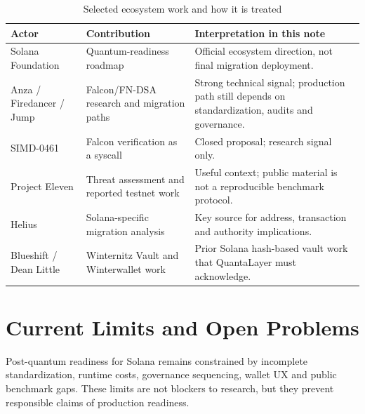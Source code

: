 \documentclass[11pt,a4paper,oneside,parskip=false]{scrartcl}
\begin{document}
\begin{table}[htbp]
\centering
\caption{Selected ecosystem work and how it is treated}
\label{tab:ecosystem-state}
\small
\begin{tabularx}{\textwidth}{L{0.23\textwidth}L{0.24\textwidth}Y}
\toprule
\textbf{Actor} & \textbf{Contribution} & \textbf{Interpretation in this note} \\
\midrule
Solana Foundation & Quantum-readiness roadmap & Official ecosystem direction, not final migration deployment. \\
Anza / Firedancer / Jump & Falcon/FN-DSA research and migration paths & Strong technical signal; production path still depends on standardization, audits and governance. \\
SIMD-0461 & Falcon verification as a syscall & Closed proposal; research signal only. \\
Project Eleven & Threat assessment and reported testnet work & Useful context; public material is not a reproducible benchmark protocol. \\
Helius & Solana-specific migration analysis & Key source for address, transaction and authority implications. \\
Blueshift / Dean Little & Winternitz Vault and Winterwallet work & Prior Solana hash-based vault work that QuantaLayer must acknowledge. \\
\bottomrule
\end{tabularx}
\end{table}

\section{Current Limits and Open Problems}

Post-quantum readiness for Solana remains constrained by incomplete standardization, runtime costs, governance sequencing, wallet UX and public benchmark gaps. These limits are not blockers to research, but they prevent responsible claims of production readiness.
\end{document}
